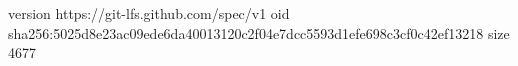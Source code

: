 version https://git-lfs.github.com/spec/v1
oid sha256:5025d8e23ac09ede6da40013120c2f04e7dcc5593d1efe698c3cf0c42ef13218
size 4677
